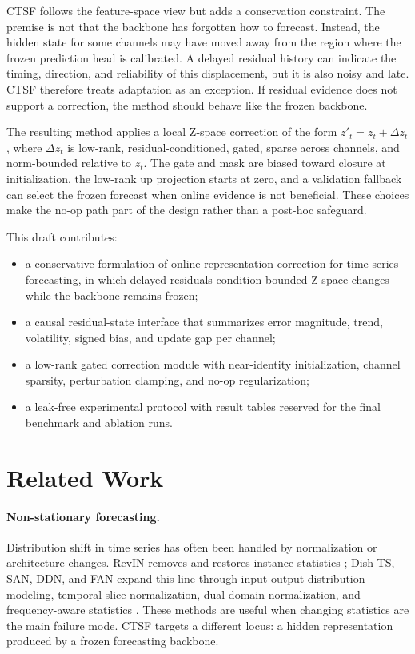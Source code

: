 \documentclass[10pt]{article}
\begin{document}
CTSF follows the feature-space view but adds a conservation constraint. The premise is not that the backbone has forgotten how to forecast. Instead, the hidden state for some channels may have moved away from the region where the frozen prediction head is calibrated. A delayed residual history can indicate the timing, direction, and reliability of this displacement, but it is also noisy and late. CTSF therefore treats adaptation as an exception. If residual evidence does not support a correction, the method should behave like the frozen backbone.

The resulting method applies a local Z-space correction of the form
$z'_t = z_t + \Delta z_t$, where $\Delta z_t$ is low-rank, residual-conditioned, gated, sparse across channels, and norm-bounded relative to $z_t$. The gate and mask are biased toward closure at initialization, the low-rank up projection starts at zero, and a validation fallback can select the frozen forecast when online evidence is not beneficial. These choices make the no-op path part of the design rather than a post-hoc safeguard.

This draft contributes:
\begin{itemize}
    \item a conservative formulation of online representation correction for time series forecasting, in which delayed residuals condition bounded Z-space changes while the backbone remains frozen;
    \item a causal residual-state interface that summarizes error magnitude, trend, volatility, signed bias, and update gap per channel;
    \item a low-rank gated correction module with near-identity initialization, channel sparsity, perturbation clamping, and no-op regularization;
    \item a leak-free experimental protocol with result tables reserved for the final benchmark and ablation runs.
\end{itemize}

\section{Related Work}
\paragraph{Non-stationary forecasting.}
Distribution shift in time series has often been handled by normalization or architecture changes. RevIN removes and restores instance statistics \cite{kim2022revin}; Dish-TS, SAN, DDN, and FAN expand this line through input-output distribution modeling, temporal-slice normalization, dual-domain normalization, and frequency-aware statistics \cite{fan2023dishts,liu2023san,dai2024ddn,ye2024fan}. These methods are useful when changing statistics are the main failure mode. CTSF targets a different locus: a hidden representation produced by a frozen forecasting backbone.
\end{document}
